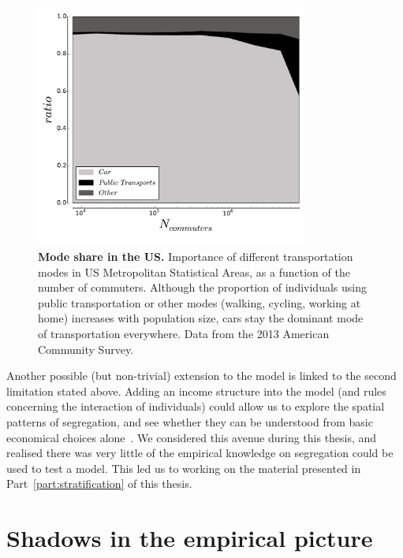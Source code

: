\begin{figure}[!h]
    \centering
    \includegraphics[width=0.8\textwidth]{gfx/chapter-monocentric/transportation_modes.pdf}
    \caption{{\bf Mode share in the US.} Importance of different transportation modes in US Metropolitan
    Statistical Areas, as a function of the number of commuters. Although the
proportion of individuals using public transportation or other modes (walking,
cycling, working at home) increases with population size, cars stay the dominant
mode of transportation everywhere. Data from the 2013 American Community
Survey.\label{fig:transportation_mode}}
\end{figure}


Another possible (but non-trivial) extension to the model is linked to the
second limitation stated above. Adding an income structure into the model (and
rules concerning the interaction of individuals) could allow us to explore the
spatial patterns of segregation, and see whether they can be understood from
basic economical choices alone~\cite{Gauvin:2013}. We considered this avenue
during this thesis, and realised there was very little of the empirical
knowledge on segregation could be used to test a model. This led us to working
on the material presented in Part~\ref{part:stratification} of this thesis.\\



\medskip

\section{Shadows in the empirical picture}
\label{sec:empirical}

